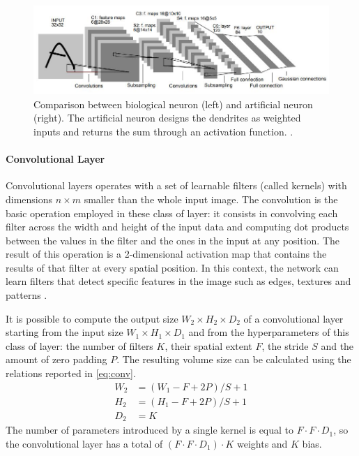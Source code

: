 \begin{figure}[!h]
	\centering
	\includegraphics[width=\textwidth]{img/lenet5.jpg}

	\caption{ Comparison between biological neuron (left) and artificial neuron (right). The artificial neuron designs the dendrites as weighted inputs and returns the sum through an activation function. \cite{stanford2019cs231n}.}
	\label{fig:lenet5}
\end{figure}

\paragraph{Convolutional Layer}

Convolutional layers \cite{lecun1995convolutional} operates with a set of learnable filters (called kernels) with dimensions $n \times m$ smaller than the whole input image. The convolution is the basic operation employed in these class of layer: it consists in convolving each filter across the width and height of the input data and computing dot products between the values in the filter and the ones in the input at any position. The result of this operation is a 2-dimensional activation map that contains the results of that filter at every spatial position.  In this context, the network can learn filters that detect specific features in the image such as edges, textures and patterns \cite{erhan2009visualizing}.

It is possible to compute the output size $W_2 \times H_2 \times D_2$ of a convolutional layer starting from the input size $W_1 \times H_1 \times D_1$ and from the hyperparameters of this class of layer: the number of filters $K$, their spatial extent $F$, the stride $S$ and the amount of zero padding $P$. The resulting volume size can be calculated using the relations reported in \vref{eq:conv}.
\begin{equation} \label{eq:conv}
	\begin{aligned}
		W_2 & = (W_1 - F + 2P)/S + 1 \\
		H_2 & = (H_1 - F + 2P)/S + 1 \\
		D_2 & = K
	\end{aligned}
\end{equation}
The number of parameters introduced by a single kernel is equal to $F \cdot F \cdot D_1$, so the convolutional layer has a total of $(F \cdot F \cdot D_1) \cdot K$ weights and $K$ bias.

